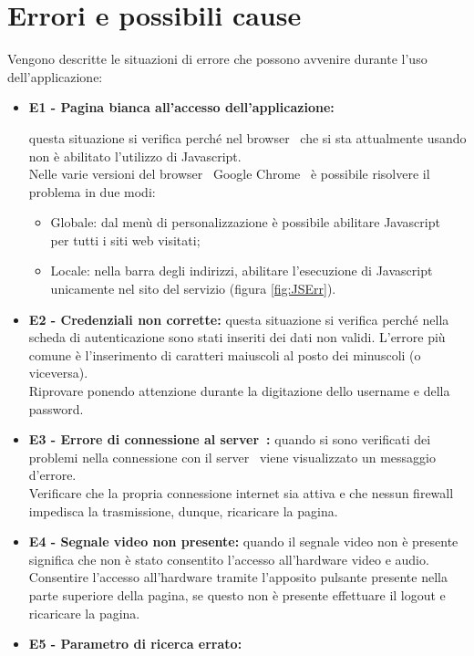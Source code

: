 \section{Errori e possibili cause} \label{errori} {

Vengono descritte le situazioni di errore che possono avvenire durante l'uso dell'applicazione:
\begin{itemize}
	\item \textbf{E1 - Pagina bianca all'accesso dell'applicazione: }{
		questa situazione si verifica perché nel browser\g~ che si sta attualmente usando non è abilitato l'utilizzo di Javascript\g .\\
		Nelle varie versioni del browser\g~ Google Chrome\g~ è possibile risolvere il problema in due modi:
		\begin{itemize}
			\item Globale: dal menù di personalizzazione è possibile abilitare Javascript\g~ per tutti i siti web visitati;
			\item Locale: nella barra degli indirizzi, abilitare l'esecuzione di Javascript\g~ unicamente nel sito del servizio (figura \ref{fig:JSErr}).
		\end{itemize}
	}
	\item \textbf{E2 - Credenziali non corrette: }{
		questa situazione si verifica perché nella scheda di autenticazione sono stati inseriti dei dati non validi. L'errore più comune è l'inserimento di caratteri maiuscoli al posto dei minuscoli (o viceversa).\\
		Riprovare ponendo attenzione durante la digitazione dello username e della password.
	}
	\item \textbf{E3 - Errore di connessione al server\g~: }{
		quando si sono verificati dei problemi nella connessione con il server\g~ viene visualizzato un messaggio d'errore.\\
		Verificare che la propria connessione internet sia attiva e che nessun firewall\g~ impedisca la trasmissione, dunque, ricaricare la pagina.
	}
	\item \textbf{E4 - Segnale video non presente: }{
		quando il segnale video non è presente significa che non è stato consentito l’accesso all’hardware video e audio.\\
		 Consentire l'accesso all'hardware tramite l'apposito pulsante presente nella parte superiore della pagina, se questo non è presente effettuare il logout e ricaricare la pagina.
	}
	\item \textbf{E5 - Parametro di ricerca errato: }{
}
\end{itemize}}
